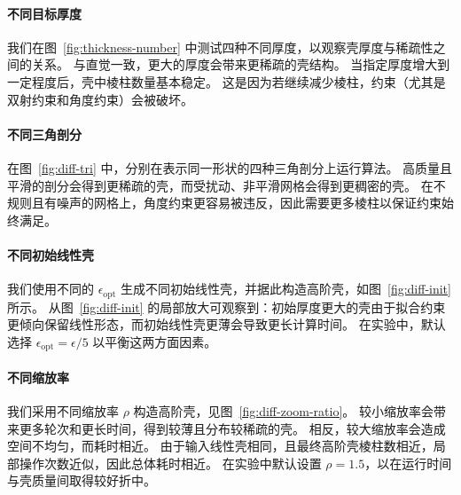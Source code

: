 \paragraph{不同目标厚度}
我们在图~\ref{fig:thickness-number} 中测试四种不同厚度，以观察壳厚度与稀疏性之间的关系。
%
与直觉一致，更大的厚度会带来更稀疏的壳结构。
%
当指定厚度增大到一定程度后，壳中棱柱数量基本稳定。
这是因为若继续减少棱柱，约束（尤其是双射约束和角度约束）会被破坏。


\paragraph{不同三角剖分}
在图~\ref{fig:diff-tri} 中，分别在表示同一形状的四种三角剖分上运行算法。
高质量且平滑的剖分会得到更稀疏的壳，而受扰动、非平滑网格会得到更稠密的壳。
%
在不规则且有噪声的网格上，角度约束更容易被违反，因此需要更多棱柱以保证约束始终满足。




\paragraph{不同初始线性壳}
我们使用不同的 $\epsilon_\text{opt}$ 生成不同初始线性壳，并据此构造高阶壳，如图~\ref{fig:diff-init} 所示。
从图~\ref{fig:diff-init} 的局部放大可观察到：初始厚度更大的壳由于拟合约束更倾向保留线性形态，而初始线性壳更薄会导致更长计算时间。 %
在实验中，默认选择 $\epsilon_\text{opt} = \epsilon/5$ 以平衡这两方面因素。


\paragraph{不同缩放率}
我们采用不同缩放率 $\rho$ 构造高阶壳，见图~\ref{fig:diff-zoom-ratio}。
%
较小缩放率会带来更多轮次和更长时间，得到较薄且分布较稀疏的壳。
相反，较大缩放率会造成空间不均匀，而耗时相近。
由于输入线性壳相同，且最终高阶壳棱柱数相近，局部操作次数近似，因此总体耗时相近。
%
在实验中默认设置 $\rho = 1.5$，以在运行时间与壳质量间取得较好折中。


